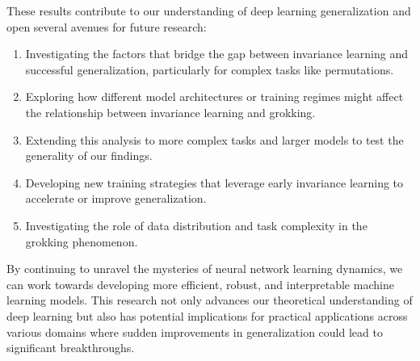 \documentclass{article} %
\begin{document}
These results contribute to our understanding of deep learning generalization and open several avenues for future research:

\begin{enumerate}
    \item Investigating the factors that bridge the gap between invariance learning and successful generalization, particularly for complex tasks like permutations.
    \item Exploring how different model architectures or training regimes might affect the relationship between invariance learning and grokking.
    \item Extending this analysis to more complex tasks and larger models to test the generality of our findings.
    \item Developing new training strategies that leverage early invariance learning to accelerate or improve generalization.
    \item Investigating the role of data distribution and task complexity in the grokking phenomenon.
\end{enumerate}

By continuing to unravel the mysteries of neural network learning dynamics, we can work towards developing more efficient, robust, and interpretable machine learning models. This research not only advances our theoretical understanding of deep learning but also has potential implications for practical applications across various domains where sudden improvements in generalization could lead to significant breakthroughs.



\end{document}
